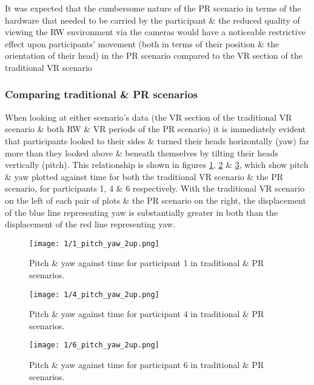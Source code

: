 It was expected that the cumbersome nature of the PR scenario in terms of the hardware that needed to be carried by the participant \& the reduced quality of viewing the RW environment via the cameras would have a noticeable restrictive effect upon participants' movement (both in terms of their position \& the orientation of their head) in the PR scenario compared to the VR section of the traditional VR scenario 

\subsubsection{Comparing traditional \& PR scenarios}

When looking at either scenario's data (the VR section of the traditional VR scenario \& both RW \& VR periods of the PR scenario) it is immediately evident that participants looked to their sides \& turned their heads horizontally (yaw) far more than they looked above \& beneath themselves by tilting their heads vertically (pitch). This relationship is shown in figures \ref{1_pitch_yaw_2up.png}, \ref{4_pitch_yaw_2up.png} \& \ref{6_pitch_yaw_2up.png}, which show pitch \& yaw plotted against time for both the traditional VR scenario \& the PR scenario, for participants 1, 4 \& 6 respectively. With the traditional VR scenario on the left of each pair of plots \& the PR scenario on the right, the displacement of the blue line representing yaw is substantially greater in both than the displacement of the red line representing yaw.

\begin{figure}
	\begin{center}
	\texttt{[image: 1/1\_pitch\_yaw\_2up.png]}
	\caption{Pitch \& yaw against time for participant 1 in traditional \& PR scenarios.}
	\label{1_pitch_yaw_2up.png}
	\end{center}
\end{figure}

\begin{figure}
	\begin{center}
	\texttt{[image: 1/4\_pitch\_yaw\_2up.png]}
	\caption{Pitch \& yaw against time for participant 4 in traditional \& PR scenarios.}
	\label{4_pitch_yaw_2up.png}
	\end{center}
\end{figure}

\begin{figure}
	\begin{center}
	\texttt{[image: 1/6\_pitch\_yaw\_2up.png]}
	\caption{Pitch \& yaw against time for participant 6 in traditional \& PR scenarios.}
	\label{6_pitch_yaw_2up.png}
	\end{center}
\end{figure}

